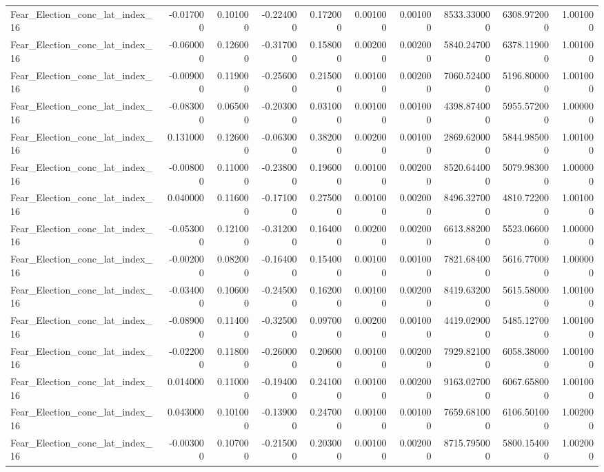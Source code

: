 \begin{table}
\begin{tabular}{lrrrrrrrrr}
Fear_Election_conc_lat_index_16 & -0.017000 & 0.101000 & -0.224000 & 0.172000 & 0.001000 & 0.001000 & 8533.330000 & 6308.972000 & 1.001000 \\
Fear_Election_conc_lat_index_16 & -0.060000 & 0.126000 & -0.317000 & 0.158000 & 0.002000 & 0.002000 & 5840.247000 & 6378.119000 & 1.001000 \\
Fear_Election_conc_lat_index_16 & -0.009000 & 0.119000 & -0.256000 & 0.215000 & 0.001000 & 0.002000 & 7060.524000 & 5196.800000 & 1.001000 \\
Fear_Election_conc_lat_index_16 & -0.083000 & 0.065000 & -0.203000 & 0.031000 & 0.001000 & 0.001000 & 4398.874000 & 5955.572000 & 1.000000 \\
Fear_Election_conc_lat_index_16 & 0.131000 & 0.126000 & -0.063000 & 0.382000 & 0.002000 & 0.001000 & 2869.620000 & 5844.985000 & 1.001000 \\
Fear_Election_conc_lat_index_16 & -0.008000 & 0.110000 & -0.238000 & 0.196000 & 0.001000 & 0.002000 & 8520.644000 & 5079.983000 & 1.000000 \\
Fear_Election_conc_lat_index_16 & 0.040000 & 0.116000 & -0.171000 & 0.275000 & 0.001000 & 0.002000 & 8496.327000 & 4810.722000 & 1.001000 \\
Fear_Election_conc_lat_index_16 & -0.053000 & 0.121000 & -0.312000 & 0.164000 & 0.002000 & 0.002000 & 6613.882000 & 5523.066000 & 1.000000 \\
Fear_Election_conc_lat_index_16 & -0.002000 & 0.082000 & -0.164000 & 0.154000 & 0.001000 & 0.001000 & 7821.684000 & 5616.770000 & 1.000000 \\
Fear_Election_conc_lat_index_16 & -0.034000 & 0.106000 & -0.245000 & 0.162000 & 0.001000 & 0.002000 & 8419.632000 & 5615.580000 & 1.001000 \\
Fear_Election_conc_lat_index_16 & -0.089000 & 0.114000 & -0.325000 & 0.097000 & 0.002000 & 0.001000 & 4419.029000 & 5485.127000 & 1.001000 \\
Fear_Election_conc_lat_index_16 & -0.022000 & 0.118000 & -0.260000 & 0.206000 & 0.001000 & 0.002000 & 7929.821000 & 6058.380000 & 1.001000 \\
Fear_Election_conc_lat_index_16 & 0.014000 & 0.110000 & -0.194000 & 0.241000 & 0.001000 & 0.002000 & 9163.027000 & 6067.658000 & 1.001000 \\
Fear_Election_conc_lat_index_16 & 0.043000 & 0.101000 & -0.139000 & 0.247000 & 0.001000 & 0.001000 & 7659.681000 & 6106.501000 & 1.002000 \\
Fear_Election_conc_lat_index_16 & -0.003000 & 0.107000 & -0.215000 & 0.203000 & 0.001000 & 0.002000 & 8715.795000 & 5800.154000 & 1.002000 \\

\end{tabular}
\end{table}
